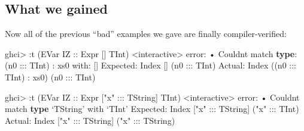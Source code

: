 \documentclass[]{article}
\newenvironment{Shaded}{}{}
\newcommand{\DataTypeTok}[1]{\textcolor[rgb]{0.56,0.13,0.00}{#1}}
\newcommand{\FunctionTok}[1]{\textcolor[rgb]{0.02,0.16,0.49}{#1}}
\newcommand{\KeywordTok}[1]{\textcolor[rgb]{0.00,0.44,0.13}{\textbf{#1}}}
\newcommand{\NormalTok}[1]{#1}
\newcommand{\OperatorTok}[1]{\textcolor[rgb]{0.40,0.40,0.40}{#1}}
\newcommand{\OtherTok}[1]{\textcolor[rgb]{0.00,0.44,0.13}{#1}}
\newcommand{\StringTok}[1]{\textcolor[rgb]{0.25,0.44,0.63}{#1}}
\begin{document}
\subsection{What we gained}\label{what-we-gained}

Now all of the previous ``bad'' examples we gave are finally compiler-verified:

\begin{Shaded}
\begin{Highlighting}[]
\NormalTok{ghci}\OperatorTok{\textgreater{}} \OperatorTok{:}\NormalTok{t (}\DataTypeTok{EVar} \DataTypeTok{IZ}\OtherTok{ ::} \DataTypeTok{Expr}\NormalTok{ \textquotesingle{}[] }\DataTypeTok{TInt}\NormalTok{)}
\OperatorTok{\textless{}}\NormalTok{interactive}\OperatorTok{\textgreater{}} \FunctionTok{error}\OperatorTok{:}
\NormalTok{    • }\DataTypeTok{Couldn\textquotesingle{}t}\NormalTok{ match }\KeywordTok{type}\OperatorTok{:}\NormalTok{ (n0 }\OperatorTok{:::} \DataTypeTok{TInt}\NormalTok{) }\OperatorTok{:}\NormalTok{ xs0}
\NormalTok{                     with}\OperatorTok{:}\NormalTok{ \textquotesingle{}[]}
      \DataTypeTok{Expected}\OperatorTok{:} \DataTypeTok{Index}\NormalTok{ \textquotesingle{}[] (n0 }\OperatorTok{:::} \DataTypeTok{TInt}\NormalTok{)}
        \DataTypeTok{Actual}\OperatorTok{:} \DataTypeTok{Index}\NormalTok{ ((n0 }\OperatorTok{:::} \DataTypeTok{TInt}\NormalTok{) }\OperatorTok{:}\NormalTok{ xs0) (n0 }\OperatorTok{:::} \DataTypeTok{TInt}\NormalTok{)}

\NormalTok{ghci}\OperatorTok{\textgreater{}} \OperatorTok{:}\NormalTok{t (}\DataTypeTok{EVar} \DataTypeTok{IZ}\OtherTok{ ::} \DataTypeTok{Expr}\NormalTok{ \textquotesingle{}[}\StringTok{"x"} \OperatorTok{:::} \DataTypeTok{TString}\NormalTok{] }\DataTypeTok{TInt}\NormalTok{)}
\OperatorTok{\textless{}}\NormalTok{interactive}\OperatorTok{\textgreater{}} \FunctionTok{error}\OperatorTok{:}
\NormalTok{    • }\DataTypeTok{Couldn\textquotesingle{}t}\NormalTok{ match }\KeywordTok{type}\NormalTok{ ‘}\DataTypeTok{TString}\NormalTok{’ with ‘}\DataTypeTok{TInt}\NormalTok{’}
      \DataTypeTok{Expected}\OperatorTok{:} \DataTypeTok{Index}\NormalTok{ \textquotesingle{}[}\StringTok{"x"} \OperatorTok{:::} \DataTypeTok{TString}\NormalTok{] (}\StringTok{"x"} \OperatorTok{:::} \DataTypeTok{TInt}\NormalTok{)}
        \DataTypeTok{Actual}\OperatorTok{:} \DataTypeTok{Index}\NormalTok{ \textquotesingle{}[}\StringTok{"x"} \OperatorTok{:::} \DataTypeTok{TString}\NormalTok{] (}\StringTok{"x"} \OperatorTok{:::} \DataTypeTok{TString}\NormalTok{)}


\end{Highlighting}
\end{Shaded}
\end{document}
